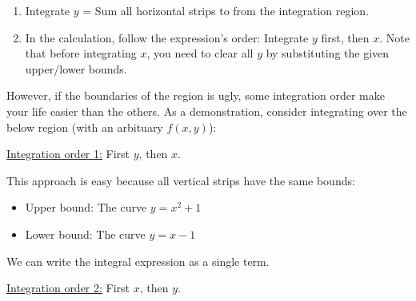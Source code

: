 \documentclass[class=article, crop=false, 12pt]{standalone}
\begin{document}
\begin{example}
\begin{enumerate}
        \item Integrate $y$ = Sum all horizontal strips to from the integration region.

        \item In the calculation, follow the expression's order: Integrate $y$ first, then $x$. 
        Note that before integrating $x$, you need to clear all $y$ by substituting the given upper/lower bounds.
    \end{enumerate}

\end{example}

However, if the boundaries of the region is ugly, 
some integration order make your life easier than the others.
As a demonstration, consider integrating over the below region (with an arbituary $f(x,y)$):


\ul{Integration order 1:} First $y$, then $x$.


This approach is easy because all vertical strips have the same bounds:
\begin{itemize}
    \item Upper bound: The curve $y=x^2+1$
    \item Lower bound: The curve $y=x-1$
\end{itemize}

We can write the integral expression as a single term.

\ul{Integration order 2:} First $x$, then $y$.\\
\end{document}
